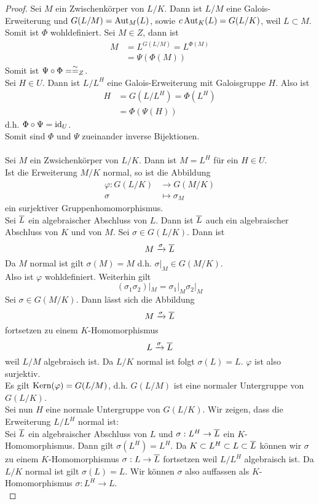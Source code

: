 	\begin{proof}
		Sei $M$ ein Zwischenkörper von $L/K$. Dann ist $L/M$ eine Galois-Erweiterung und $G(L/M)=\operatorname{Aut}_M(L)$, sowie $c\operatorname{Aut}_K(L)=G(L/K)$, weil $L\subset M$.\\
		Somit ist $\Phi$ wohldefiniert. Sei $M\in Z$, dann ist
		\begin{align*}
		M&=L^{G(L/M)}=L^{\Phi(M)}\\
		&=\Psi(\Phi(M))
		\end{align*}
		Somit ist $\Psi\circ\Phi=\overset{\sim}{=}_Z$.\\
		Sei $H\in U$. Dann ist $L/L^H$ eine Galois-Erweiterung mit Galoisgruppe $H$. Also ist
		\begin{align*}
		H&=G(L/L^H)=\Phi(L^H)\\
		&=\Phi(\Psi(H))
		\end{align*}
		d.h. $\Phi\circ\Psi=\operatorname{id}_U$.\\
		Somit sind $\Phi$ und $\Psi$ zueinander inverse Bijektionen.\\
		\\
		Sei $M$ ein Zwsichenkörper von $L/K$. Dann ist $M=L^H$ für ein $H\in U$.\\
		Ist die Erweiterung $M/K$ normal, so ist die Abbildung
		\begin{align*}
		\varphi:G(L/K)&\to G(M/K)\\
		\sigma&\mapsto \sigma_M
		\end{align*}
		ein surjektiver Gruppenhomomorphismus.\\
		Sei $\overline{L}$ ein algebraischer Abschluss von $L$. Dann ist $\overline{L}$ auch ein algebraischer Abschluss von $K$ und von $M$. Sei $\sigma\in G(L/K)$. Dann ist
		\[M\xrightarrow{\sigma}\overline{L}\]
		Da $M$ normal ist gilt $\sigma(M)=M$ d.h. $\sigma|_M\in G(M/K)$.\\
		Also ist $\varphi$ wohldefiniert. Weiterhin gilt
		\[(\sigma_1\sigma_2)|_M=\sigma_1|_M\sigma_2|_M\]
		Sei $\sigma\in G(M/K)$. Dann lässt sich die Abbildung
		\[M\xrightarrow{\sigma}\overline{L}\]
		fortsetzen zu einem $K$-Homomorphismus
		\[L\xrightarrow{\sigma}\overline{L}\]
		weil $L/M$ algebraisch ist. Da $L/K$ normal ist folgt $\sigma(L)=L$. $\varphi$ ist also surjektiv.\\
		Es gilt $\operatorname{Kern}(\varphi)=G(L/M)$, d.h. $G(L/M)$ ist eine normaler Untergruppe von $G(L/K)$.\\
		Sei nun $H$ eine normale Untergruppe von $G(L/K)$. Wir zeigen, dass die Erweiterung $L/L^H$ normal ist:\\
		Sei $\overline{L}$ ein algebraischer Abschluss von $L$ und $\sigma:L^H\to\overline{L}$ ein $K$-Homomorphismus. Dann gilt $\sigma(L^H)=L^H$. Da $K\subset L^H\subset L\subset\overline{L}$ können wir $\sigma$ zu einem $K$-Homomorphismus $\sigma:L\to\overline{L}$ fortsetzen weil $L/L^H$ algebraisch ist. Da $L/K$ normal ist gilt $\sigma(L)=L$. Wir können $\sigma$ also auffassen als $K$-Homomorphismus $\sigma:L^H\to L$.\\

\end{proof}
